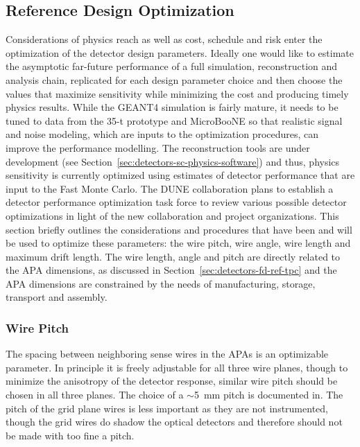 \subsection{Reference Design Optimization}
\label{sec:detectors-fd-ref-optimization}

Considerations of physics reach as well as cost, schedule and risk
enter the optimization of the detector design parameters.  Ideally one
would like to estimate the asymptotic far-future performance of a full
simulation, reconstruction and analysis chain, replicated for each
design parameter choice and then choose the values that maximize
sensitivity while minimizing the cost and producing timely physics
results. While the GEANT4 simulation is fairly mature, it needs to be
tuned to data from the 35-t prototype and MicroBooNE so that realistic
signal and noise modeling, which are inputs to the optimization
procedures, can improve the performance modelling.  The reconstruction
tools are under development (see
Section~\ref{sec:detectors-sc-physics-software}) and thus, physics
sensitivity is currently optimized using estimates of detector
performance that are input to the Fast Monte Carlo. The DUNE
collaboration plans to establish a detector performance optimization
task force to review various possible detector optimizations in light
of the new collaboration and project organizations.  This section
briefly outlines the considerations and procedures that have been and
will be used to optimize these parameters: the wire pitch, wire angle,
wire length and maximum drift length.  The wire length, angle and
pitch are directly related to the APA dimensions, as discussed in
Section~\ref{sec:detectors-fd-ref-tpc} and the APA dimensions are
constrained by the needs of manufacturing, storage, transport and
assembly.

\subsubsection{Wire Pitch}

The spacing between neighboring sense wires in the APAs is an
optimizable parameter.  In principle it is freely adjustable for all
three wire planes, though to minimize the anisotropy of the detector
response, similar wire pitch should be chosen in all three planes.
The choice of a $\sim$5~mm pitch is documented in\cite{docdb-3407}.
The pitch of the grid plane wires is less important as they are not
instrumented, though the grid wires do shadow the optical detectors
and therefore should not be made with too fine a pitch.

